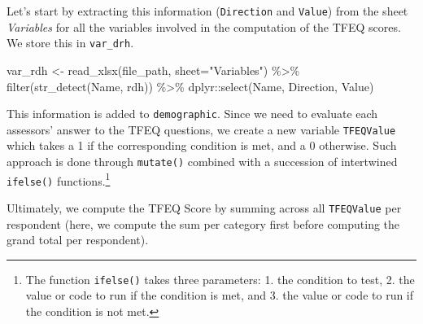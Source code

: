 \documentclass[
]{book}
\newenvironment{Shaded}{\begin{snugshade}}{\end{snugshade}}
\newcommand{\AttributeTok}[1]{\textcolor[rgb]{0.77,0.63,0.00}{#1}}
\newcommand{\FunctionTok}[1]{\textcolor[rgb]{0.00,0.00,0.00}{#1}}
\newcommand{\NormalTok}[1]{#1}
\newcommand{\OtherTok}[1]{\textcolor[rgb]{0.56,0.35,0.01}{#1}}
\newcommand{\SpecialCharTok}[1]{\textcolor[rgb]{0.00,0.00,0.00}{#1}}
\newcommand{\StringTok}[1]{\textcolor[rgb]{0.31,0.60,0.02}{#1}}
\begin{document}
Let's start by extracting this information (\texttt{Direction} and \texttt{Value}) from the sheet \emph{Variables} for all the variables involved in the computation of the TFEQ scores. We store this in \texttt{var\_drh}.

\begin{Shaded}
\begin{Highlighting}[]
\NormalTok{var\_rdh }\OtherTok{\textless{}{-}} \FunctionTok{read\_xlsx}\NormalTok{(file\_path, }\AttributeTok{sheet=}\StringTok{"Variables"}\NormalTok{) }\SpecialCharTok{\%\textgreater{}\%} 
  \FunctionTok{filter}\NormalTok{(}\FunctionTok{str\_detect}\NormalTok{(Name, rdh)) }\SpecialCharTok{\%\textgreater{}\%} 
\NormalTok{  dplyr}\SpecialCharTok{::}\FunctionTok{select}\NormalTok{(Name, Direction, Value)}
\end{Highlighting}
\end{Shaded}

This information is added to \texttt{demographic}. Since we need to evaluate each assessors' answer to the TFEQ questions, we create a new variable \texttt{TFEQValue} which takes a 1 if the corresponding condition is met, and a 0 otherwise. Such approach is done through \texttt{mutate()} combined with a succession of intertwined \texttt{ifelse()} functions.\footnote{The function \texttt{ifelse()} takes three parameters: 1. the condition to test, 2. the value or code to run if the condition is met, and 3. the value or code to run if the condition is not met.}

Ultimately, we compute the TFEQ Score by summing across all \texttt{TFEQValue} per respondent (here, we compute the sum per category first before computing the grand total per respondent).
\end{document}

